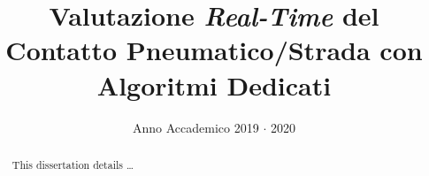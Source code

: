 \documentclass[12pt,a4paper,twoside]{memoir} %
\title{\textbf{Valutazione \textit{Real-Time} del Contatto Pneumatico/Strada con Algoritmi Dedicati}} %
\date{Anno Accademico 2019 $\cdot$ 2020} %
\begin{document}
\begin{titlingpage}
\maketitle %
\end{titlingpage}

\frontmatter %

\cleartooddpage %


\begin{abstract}
This dissertation details \dots
\end{abstract}

\cleartooddpage %

\tableofcontents* %

\cleartooddpage %


\listoffigures* %

\cleartooddpage %


\listoftables* %

\cleartooddpage %

\end{document}
